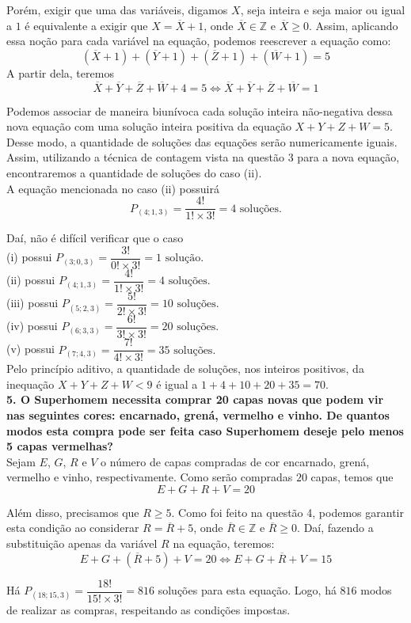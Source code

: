 \documentclass[12pt, a4paper]{article}
\begin{document}
Porém, exigir que uma das variáveis, digamos \(X\), seja inteira e seja maior ou igual a \(1\) é equivalente a exigir que \(X = \overline{X} + 1\), onde \(\overline{X} \in \mathbb{Z}\) e \(\overline{X} \geq 0\). Assim, aplicando essa noção para cada variável na equação, podemos reescrever a equação como: \[(\overline{X}+1)+(\overline{Y}+1)+(\overline{Z}+1)+(\overline{W}+1)=5\]A partir dela, teremos \[\overline{X}+\overline{Y}+\overline{Z}+\overline{W}+4=5 \Longleftrightarrow   \overline{X}+\overline{Y}+\overline{Z}+\overline{W}=1\] 

Podemos associar de maneira biunívoca cada solução inteira não-negativa dessa nova equação com uma solução inteira positiva da equação \(X+Y+Z+W=5\). Desse modo, a quantidade de soluções das equações  serão numericamente iguais. Assim, utilizando a técnica de contagem vista na questão 3 para a nova equação, encontraremos a quantidade de soluções do caso (ii). \\

A equação mencionada no caso (ii) possuirá \[P_{(4;1,3)}=\dfrac{4!}{1!\times 3!} = 4 \text{ soluções.}\]

Daí, não é difícil verificar que o caso \\


(i) possui \(P_{(3;0,3)}=\dfrac{3!}{0!\times 3!} = 1 \text{ solução.}\) \\

(ii) possui \(P_{(4;1,3)}=\dfrac{4!}{1!\times 3!} = 4 \text{ soluções.}\) \\

(iii) possui \(P_{(5;2,3)}=\dfrac{5!}{2!\times 3!} = 10 \text{ soluções.}\) \\

(iv) possui \(P_{(6;3,3)}=\dfrac{6!}{3!\times 3!} = 20 \text{ soluções.}\) \\

(v) possui \(P_{(7;4,3)}=\dfrac{7!}{4!\times 3!} = 35 \text{ soluções.}\) \\

Pelo princípio aditivo, a quantidade de soluções, nos inteiros positivos, da inequação \(X+Y+Z+W<9\) é igual a \(1+4+10+20+35=70\). \\


\textbf{5. O Superhomem necessita comprar 20 capas novas que podem vir nas seguintes cores: encarnado, grená, vermelho e vinho. De quantos modos esta compra pode ser feita caso Superhomem deseje pelo menos 5 capas vermelhas?} \\

Sejam \(E\), \(G\), \(R\) e \(V\) o número de capas compradas de cor encarnado, grená, vermelho e vinho, respectivamente. Como serão compradas \(20\) capas, temos que \[E+G+R+V=20\]

Além disso, precisamos que \(R \geq 5\). Como foi feito na questão 4, podemos garantir esta condição ao considerar \(R = \overline{R} + 5\), onde \(\overline{R} \in \mathbb{Z}\) e \(\overline{R} \geq 0\). Daí, fazendo a substituição apenas da variável \(R\) na equação, teremos:\[E+G+(\overline{R}+5)+V=20 \Longleftrightarrow E+G+\overline{R}+V = 15\]

Há \(P_{(18;15,3)}=\dfrac{18!}{15! \times 3!} = 816\) soluções para esta equação. Logo, há \(816\) modos de realizar as compras, respeitando as condições impostas.
\end{document}
